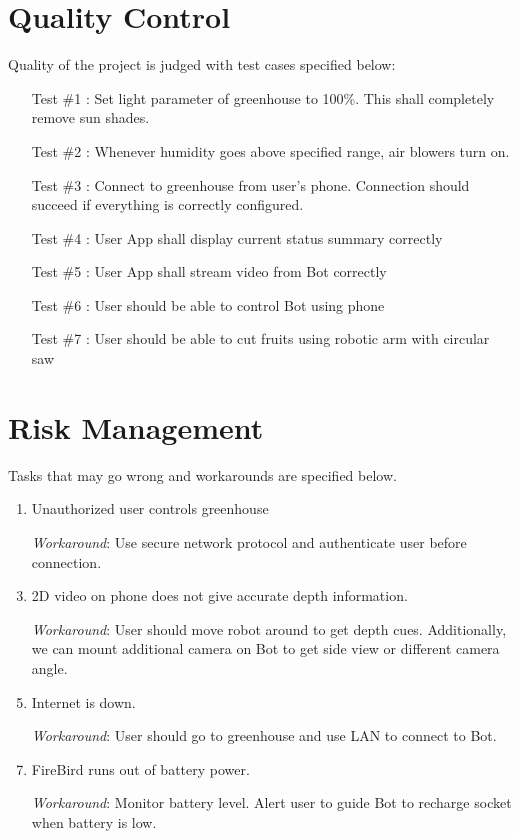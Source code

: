 \documentclass[a4paper, 12pt]{article}
\begin{document}
\section{Quality Control}
Quality of the project is judged with test cases specified below:
\begin{enumerate}
 \item[Test \#1]: Set light parameter of greenhouse to 100\%. This shall completely remove sun shades.
 \item[Test \#2]: Whenever humidity goes above specified range, air blowers turn on.
 \item[Test \#3]: Connect to greenhouse from user's phone. Connection should succeed if everything is correctly configured.
 \item[Test \#4]: User App shall display current status summary correctly
 \item[Test \#5]: User App shall stream video from Bot correctly
 \item[Test \#6]: User should be able to control Bot using phone 
 \item[Test \#7]: User should be able to cut fruits using robotic arm with circular saw
 \end{enumerate}

\section{Risk Management}
Tasks that may go wrong and workarounds are specified below.
\begin{enumerate}
 \item Unauthorized user controls greenhouse
 \item[] \emph{Workaround}: Use secure network protocol and authenticate user before connection.
 \item 2D video on phone does not give accurate depth information.
 \item[] \emph{Workaround}: User should move robot around to get depth cues. Additionally, we can mount additional camera on
 Bot to get side view or different camera angle. 
 \item Internet is down.
 \item[] \emph{Workaround}: User should go to greenhouse and use LAN to connect to Bot.
 \item FireBird runs out of battery power.
 \item[] \emph{Workaround}: Monitor battery level. Alert user to guide Bot to recharge socket when battery is low. 
\end{enumerate}


\end{document}
